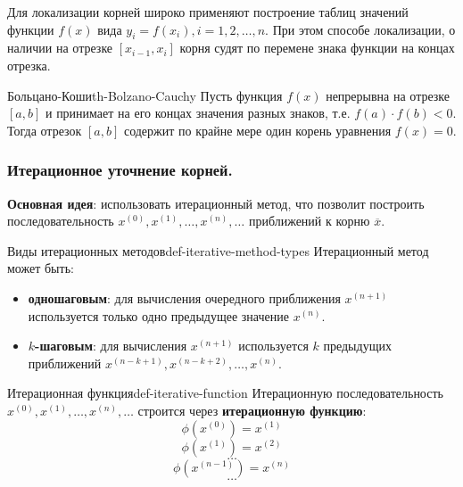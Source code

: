 \documentclass[14pt]{extarticle}
\begin{document}
        \vspace{\baselineskip}
        
        Для локализации корней широко применяют построение таблиц значений функции $f(x)$ вида $y_{i} = f(x_{i}), i = 1, 2, \ldots, n$. При этом способе локализации, о наличии на отрезке $[x_{i-1}, x_{i}]$ корня судят по перемене знака функции на концах отрезка.

        \begin{theorem}{Больцано-Коши}{th-Bolzano-Cauchy}
            Пусть функция $f(x)$ непрерывна на отрезке $[a, b]$ и принимает на его концах значения разных знаков, т.е. $f(a) \cdot f(b) < 0$.\\ 
            Тогда отрезок $[a, b]$ содержит по крайне мере один корень уравнения $f(x) = 0$.
        \end{theorem}

    \clearpage
    \subsubsection{Итерационное уточнение корней.}
        
        \textbf{Основная идея}: использовать итерационный метод, что позволит построить последовательность $x^{(0)}, x^{(1)}, \ldots, x^{(n)}, \ldots$ приближений к корню $\overline{x}$.

        \begin{definition}{Виды итерационных методов}{def-iterative-method-types}
            Итерационный метод может быть: 
            \begin{itemize}
                \item \textbf{одношаговым}: для вычисления очередного приближения $x^{(n+1)}$ используется только одно предыдущее значение $x^{(n)}$.
                \item \textbf{$k$-шаговым}: для вычисления $x^{(n+1)}$ используется $k$ предыдущих приближений $x^{(n - k + 1)}, x^{(n - k + 2)}, \ldots, x^{(n)}$.
            \end{itemize}
        \end{definition}

        \begin{definition}{Итерационная функция}{def-iterative-function}
            Итерационную последовательность $x^{(0)}, x^{(1)}, \ldots, x^{(n)}, \ldots$ строится через \textbf{итерационную функцию}:
            $$\phi(x^{(0)}) = x^{(1)}$$
            $$\phi(x^{(1)}) = x^{(2)}$$
            $$\ldots$$
            $$\phi(x^{(n-1)}) = x^{(n)}$$
            $$\ldots$$
        \end{definition}
\end{document}
